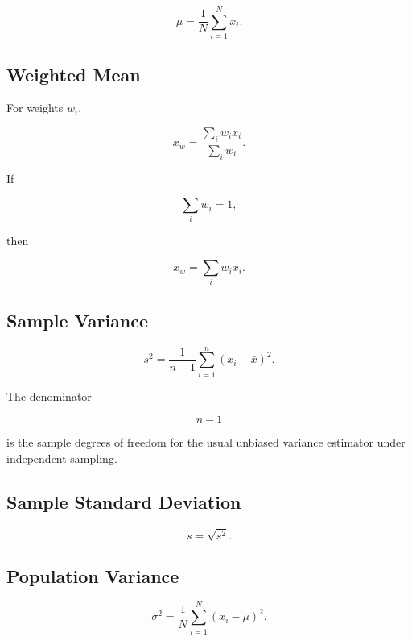 \[
\boxed{
\mu
=
\frac1N
\sum_{i=1}^{N}x_i.
}
\]

\subsection{Weighted Mean}
\label{subsec:weighted-mean-reference}

For weights \(w_i\),

\[
\boxed{
\bar{x}_w
=
\frac{
\sum_iw_ix_i
}{
\sum_iw_i
}.
}
\]

If

\[
\sum_iw_i=1,
\]

then

\[
\boxed{
\bar{x}_w
=
\sum_iw_ix_i.
}
\]

\subsection{Sample Variance}
\label{subsec:sample-variance-reference}

\[
\boxed{
s^2
=
\frac{
1
}{
n-1
}
\sum_{i=1}^{n}
(x_i-\bar{x})^2.
}
\]

The denominator

\[
n-1
\]

is the sample degrees of freedom for the usual unbiased variance estimator
under independent sampling.

\subsection{Sample Standard Deviation}
\label{subsec:sample-standard-deviation-reference}

\[
\boxed{
s
=
\sqrt{s^2}.
}
\]

\subsection{Population Variance}
\label{subsec:population-variance-reference}

\[
\boxed{
\sigma^2
=
\frac1N
\sum_{i=1}^{N}
(x_i-\mu)^2.
}
\]

